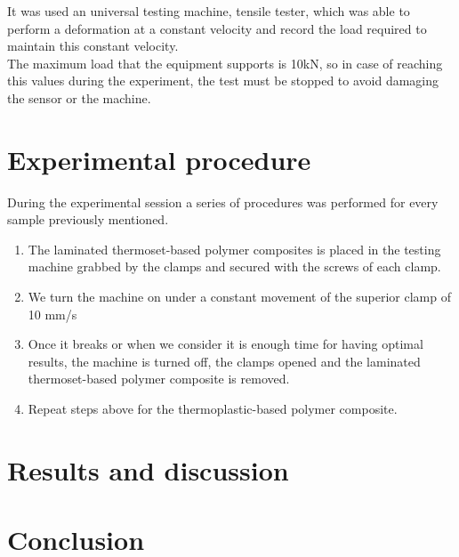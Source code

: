 It was used an universal testing machine, tensile tester, which was able to perform
a deformation at a constant velocity and record the load required to maintain this
constant velocity.\\

The maximum load that the equipment supports is 10kN, so in case of reaching this
values during the experiment, the test must be stopped to avoid damaging the sensor
or the machine.\\


\section{Experimental procedure}

During the experimental session a series of procedures was performed for every
sample previously mentioned.\\

\begin{enumerate}
	\item The laminated thermoset-based polymer composites is placed in the
	testing machine grabbed by the clamps and secured with the screws of each clamp.
	\item We turn the machine on under a constant movement of the superior
	clamp of 10 mm/s
	\item Once it breaks or when we consider it is enough time for having
	optimal results, the machine is turned off, the clamps opened and the
	laminated thermoset-based polymer composite is removed.
	\item Repeat steps above for the thermoplastic-based polymer composite.
\end{enumerate}

\section{Results and discussion}



\section{Conclusion}
